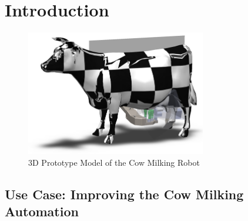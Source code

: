 \chapter{Introduction}\label{chap:introduction}
   \begin{figure}[!ht]
        \centering
        \includegraphics[width=0.7\textwidth]{images/cow_system.png}
        \caption{3D Prototype Model of the Cow Milking Robot}
        \label{fig:cow_fmc}
    \end{figure}
    
\section{Use Case: Improving the Cow Milking Automation}

\lipsum[2-5]

    
    
    

